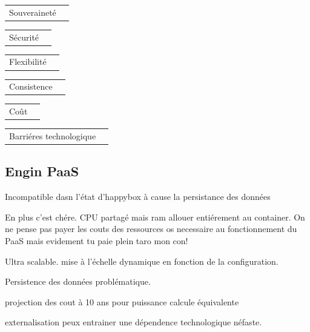 \documentclass[11pt, a4paper ]{article}
\begin{document}
\begin{spacing}{1.5}
\begin{center}
	\begin{tabular}{| l | c | }
		Souveraineté & \\
	\end{tabular}
	\begin{tabular}{| l | c | }
		Sécurité & \\
	\end{tabular}
	\begin{tabular}{| l | c | }
		Flexibilité & \\
	\end{tabular}
	\begin{tabular}{| l | c | }
		Consistence & \\
	\end{tabular}
	\begin{tabular}{| l | c | }
		Coût & \\
	\end{tabular}
	\begin{tabular}{| l | c | }
		Barriéres technologique & \\
	\end{tabular}
\end{center}

			\subsection{Engin PaaS}


Incompatible dasn l'état d'happybox à cause la persistance des données

En plus c'est chére. CPU partagé mais ram allouer entiérement au container. On ne pense pas payer les couts des ressources os necessaire au fonctionnement du PaaS mais evidement tu paie plein taro mon con!

Ultra scalable. mise à l'échelle dynamique en fonction de la configuration.

Persistence des données problématique.

projection des cout à 10 ans pour puissance calcule équivalente

externalisation peux entrainer une dépendence technologique néfaste.


\end{spacing}
\end{document}
